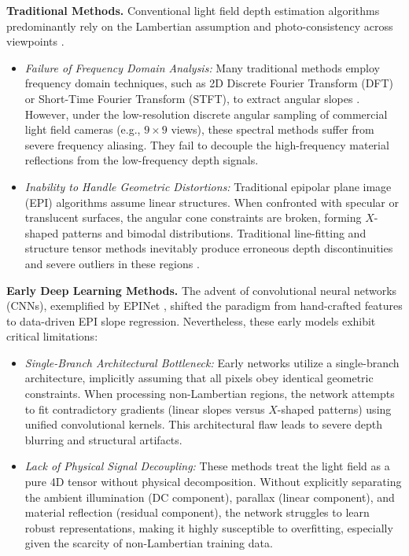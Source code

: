 \textbf{Traditional Methods.} 
Conventional light field depth estimation algorithms predominantly rely on the Lambertian assumption and photo-consistency across viewpoints \cite{wanner2012variational, johan2014lenslet}. 
\begin{itemize}
    \item \textit{Failure of Frequency Domain Analysis:} Many traditional methods employ frequency domain techniques, such as 2D Discrete Fourier Transform (DFT) or Short-Time Fourier Transform (STFT), to extract angular slopes \cite{kim2013depth}. However, under the low-resolution discrete angular sampling of commercial light field cameras (e.g., $9 \times 9$ views), these spectral methods suffer from severe frequency aliasing. They fail to decouple the high-frequency material reflections from the low-frequency depth signals.
    \item \textit{Inability to Handle Geometric Distortions:} Traditional epipolar plane image (EPI) algorithms assume linear structures. When confronted with specular or translucent surfaces, the angular cone constraints are broken, forming $X$-shaped patterns and bimodal distributions. Traditional line-fitting and structure tensor methods inevitably produce erroneous depth discontinuities and severe outliers in these regions \cite{zhang2015light}.
\end{itemize}

\textbf{Early Deep Learning Methods.} 
The advent of convolutional neural networks (CNNs), exemplified by EPINet \cite{shin2018epinet}, shifted the paradigm from hand-crafted features to data-driven EPI slope regression. Nevertheless, these early models exhibit critical limitations:
\begin{itemize}
    \item \textit{Single-Branch Architectural Bottleneck:} Early networks utilize a single-branch architecture, implicitly assuming that all pixels obey identical geometric constraints. When processing non-Lambertian regions, the network attempts to fit contradictory gradients (linear slopes versus $X$-shaped patterns) using unified convolutional kernels. This architectural flaw leads to severe depth blurring and structural artifacts.
    \item \textit{Lack of Physical Signal Decoupling:} These methods treat the light field as a pure 4D tensor without physical decomposition. Without explicitly separating the ambient illumination (DC component), parallax (linear component), and material reflection (residual component), the network struggles to learn robust representations, making it highly susceptible to overfitting, especially given the scarcity of non-Lambertian training data.
\end{itemize}

